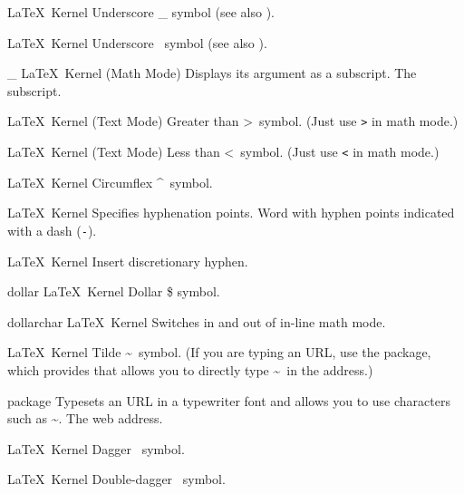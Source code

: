  {\textunderscore}
 {}
 {\LaTeX\ Kernel}
 {Underscore \_ symbol (see also ).}
 {}

 {}
 {\LaTeX\ Kernel}
 {Underscore \textunderscore\ symbol (see also ).}
 {}

 {\_}
 {}
 {\LaTeX\ Kernel (Math Mode)}
 {Displays its argument as a subscript.}
 {%
   \BeginArgList
      The subscript.
   \EndArgList
 }

%
 {}%
 {\LaTeX\ Kernel (Text Mode)}%
 {Greater than \textgreater\ symbol. (Just use \texttt{\textgreater} in math mode.)}%
 {}

%
 {}%
 {\LaTeX\ Kernel (Text Mode)}%
 {Less than \textless\ symbol. (Just use \texttt{\textless} in math mode.)}%
 {}

%
 {}%
 {\LaTeX\ Kernel}%
 {Circumflex \textasciicircum\ symbol.}%
 {}%

 {}
 {\LaTeX\ Kernel}
 {Specifies hyphenation points.}
 {%
   \BeginArgList
     Word with hyphen points indicated with a
     dash (\texttt{-}).
   \EndArgList
 }

 {}
 {\LaTeX\ Kernel}
 {Insert discretionary hyphen.}
 {}

 {dollar}
 {\dollarsym}
 {}
 {\LaTeX\ Kernel}
 {Dollar \$ symbol.}
 {}

 {dollarchar}
 {\dollarsym}
 {}
 {\LaTeX\ Kernel}
 {Switches in and out of in-line math mode.}
 {}

%
 {}%
 {\LaTeX\ Kernel}%
 {Tilde \textasciitilde\ symbol. (If you are typing an
  URL, use the  package, which provides 
  that allows you to directly type \textasciitilde\ in the address.)}%
 {}%

%
 {}%
 { package}%
 {Typesets an URL in a typewriter font and allows you to use
  characters such as \textasciitilde.}%
 {%
   \BeginArgList
     The web address.
   \EndArgList
 }%

%
 {}%
 {\LaTeX\ Kernel}%
 {Dagger \dag\ symbol.}%
 {}

%
 {}%
 {\LaTeX\ Kernel}%
 {Double-dagger \ddag\ symbol.}%
 {}

